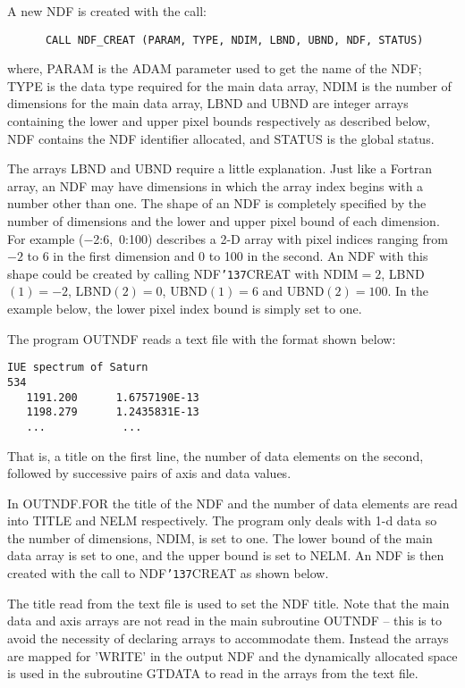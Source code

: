\documentclass[twoside,11pt]{article}
\renewcommand{\_}{{\tt\char'137}}
\begin{document}
A new NDF is created with the call:
\begin{verbatim}
      CALL NDF_CREAT (PARAM, TYPE, NDIM, LBND, UBND, NDF, STATUS)
\end{verbatim}
where, PARAM is the ADAM parameter used to get the name of the NDF;
TYPE is the data type required for the  main data array,
NDIM is the number of dimensions for the main data array,
LBND and UBND are integer arrays containing  the lower and upper pixel bounds 
respectively as described below,
NDF contains  the NDF identifier allocated, and STATUS is the global status.

The arrays LBND and UBND require a little explanation. 
Just like a Fortran array, an NDF may have dimensions in which the 
array index begins with a number other than one.
The shape of an NDF is completely specified by the number of dimensions
and the lower and upper pixel bound of each dimension.
For example ($-$2:6,~0:100) describes a 2-D array with pixel indices
ranging from $-2$ to 6 in the first dimension and 0 to 100 in the second.
An NDF with this shape could be created by calling NDF\_CREAT with
NDIM$=2$, LBND$(1)=-2$, LBND$(2)=0$, UBND$(1)=6$ and UBND$(2)=100$. 
In the example below, the lower pixel index bound is simply set  to 
one.

The program OUTNDF reads a text file with 
the format  shown below:
\begin{verbatim}
IUE spectrum of Saturn
534
   1191.200      1.6757190E-13   
   1198.279      1.2435831E-13   
   ...            ...
\end{verbatim}
That is, a title on the first line, the number of data elements on the 
second, followed by successive pairs of axis and data values.

In OUTNDF.FOR the title of the NDF and the number of data elements 
are read into TITLE and NELM respectively.
The program only deals with 1-d data so the
number of dimensions, NDIM, is set to one.
The lower bound of the main data array  is set to one, 
and the upper bound is set to NELM.
An NDF is then created with the call to NDF\_CREAT as shown below.

The title read from the text file is used to set the NDF title.
Note that the main data and axis arrays are not read in the main subroutine 
OUTNDF --  this is to avoid the necessity of declaring arrays to accommodate 
them.
Instead the arrays are mapped for 'WRITE'  in the output NDF 
and the dynamically allocated space is used in 
the subroutine GTDATA to read in the arrays from 
the text file.
\end{document}
